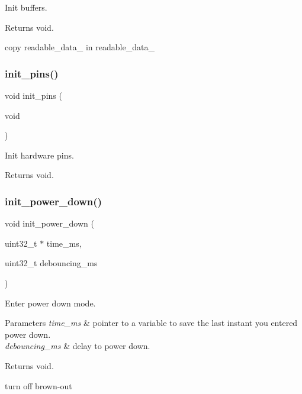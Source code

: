 Init buffers. 

\begin{DoxyReturn}{Returns}
void. 
\end{DoxyReturn}
copy readable\+\_\+data\+\_ in readable\+\_\+data\+\_ \mbox{\label{rmap_8ino_ad8b80a0c08f928106018edd6ea435b95}} 
\subsubsection{\texorpdfstring{init\+\_\+pins()}{init\_pins()}}
{\footnotesize\ttfamily void init\+\_\+pins (\begin{DoxyParamCaption}\item[{void}]{ }\end{DoxyParamCaption})}



Init hardware pins. 

\begin{DoxyReturn}{Returns}
void. 
\end{DoxyReturn}
\mbox{\label{rmap_8ino_afb98a0f07c30784284f48271ffe02b97}} 
\subsubsection{\texorpdfstring{init\+\_\+power\+\_\+down()}{init\_power\_down()}}
{\footnotesize\ttfamily void init\+\_\+power\+\_\+down (\begin{DoxyParamCaption}\item[{uint32\+\_\+t $\ast$}]{time\+\_\+ms,  }\item[{uint32\+\_\+t}]{debouncing\+\_\+ms }\end{DoxyParamCaption})}



Enter power down mode. 


\begin{DoxyParams}{Parameters}
{\em time\+\_\+ms} & pointer to a variable to save the last instant you entered power down. \\
\hline
{\em debouncing\+\_\+ms} & delay to power down. \\
\hline
\end{DoxyParams}
\begin{DoxyReturn}{Returns}
void. 
\end{DoxyReturn}
turn off brown-\/out \mbox{\label{rmap_8ino_ab985cc69f5f573113405b4f118c96d33}} 
